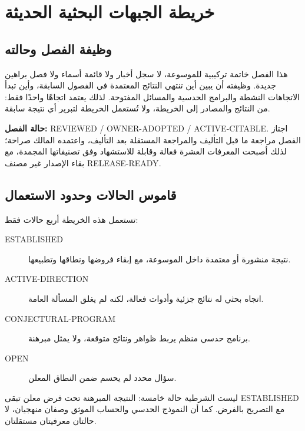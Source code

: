\chapter{خريطة الجبهات البحثية الحديثة}
\label{ch:final-research-frontiers-map}

\section*{وظيفة الفصل وحالته}

هذا الفصل خاتمة تركيبية للموسوعة، لا سجل أخبار ولا قائمة أسماء ولا فصل براهين جديدة. وظيفته أن يبين أين تنتهي النتائج المعتمدة في الفصول السابقة، وأين تبدأ الاتجاهات النشطة والبرامج الحدسية والمسائل المفتوحة. لذلك يعتمد اتجاهًا واحدًا فقط: من النتائج والمصادر إلى الخريطة، ولا تُستعمل الخريطة لتبرير أي نتيجة سابقة.

\noindent\textbf{حالة الفصل:}
\textenglish{REVIEWED / OWNER-ADOPTED / ACTIVE-CITABLE}. اجتاز الفصل مراجعة ما قبل التأليف والمراجعة المستقلة بعد التأليف، واعتمده المالك صراحة؛ لذلك أصبحت المعرفات العشرة فعالة وقابلة للاستشهاد وفق تصنيفاتها المجمدة، مع بقاء الإصدار غير مصنف \textenglish{RELEASE-READY}.

\section{قاموس الحالات وحدود الاستعمال}

\begin{definition}
\label{def:ch26-frontier-status}
تستعمل هذه الخريطة أربع حالات فقط:
\begin{description}
  \item[\textenglish{ESTABLISHED}] نتيجة منشورة أو معتمدة داخل الموسوعة، مع إبقاء فروضها ونطاقها وتطبيعها.
  \item[\textenglish{ACTIVE-DIRECTION}] اتجاه بحثي له نتائج جزئية وأدوات فعالة، لكنه لم يغلق المسألة العامة.
  \item[\textenglish{CONJECTURAL-PROGRAM}] برنامج حدسي منظم يربط ظواهر ونتائج متوقعة، ولا يمثل مبرهنة.
  \item[\textenglish{OPEN}] سؤال محدد لم يحسم ضمن النطاق المعلن.
\end{description}
ليست الشرطية حالة خامسة: النتيجة المبرهنة تحت فرض معلن تبقى \textenglish{ESTABLISHED} مع التصريح بالفرض. كما أن النموذج الحدسي والحساب الموثق وصفان منهجيان، لا حالتان معرفيتان مستقلتان.
\end{definition}

